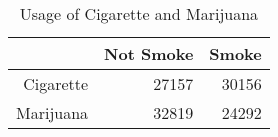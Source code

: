\begin{table}[ht]
\centering
\begin{tabular}{rrr}
  \hline
 & Not Smoke & Smoke \\ 
  \hline
Cigarette & 27157 & 30156 \\ 
  Marijuana & 32819 & 24292 \\ 
   \hline
\end{tabular}
\caption{Usage of Cigarette and Marijuana} 
\end{table}
